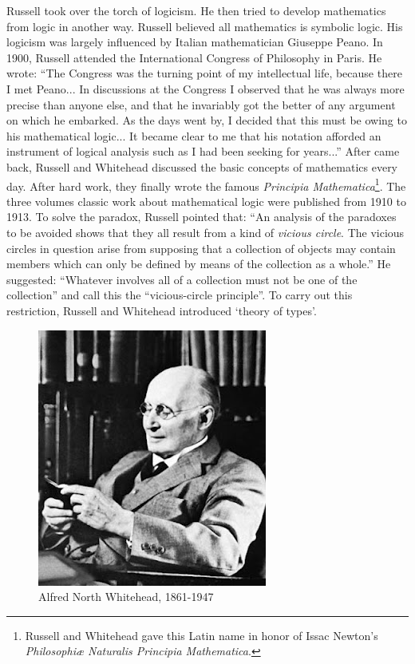 \documentclass{article}
\begin{document}
Russell took over the torch of logicism. He then tried to develop mathematics from logic in another way. Russell believed all mathematics is symbolic logic. His logicism was largely influenced by Italian mathematician Giuseppe Peano. In 1900, Russell attended the International Congress of Philosophy in Paris. He wrote: ``The Congress was the turning point of my intellectual life, because there I met Peano... In discussions at the Congress I observed that he was always more precise than anyone else, and that he invariably got the better of any argument on which he embarked. As the days went by, I decided that this must be owing to his mathematical logic... It became clear to me that his notation afforded an instrument of logical analysis such as I had been seeking for years...'' After came back, Russell and Whitehead discussed the basic concepts of mathematics every day. After hard work, they finally wrote the famous {\em Principia Mathematica}\footnote{Russell and Whitehead gave this Latin name in honor of Issac Newton's {\em Philosophiæ Naturalis Principia Mathematica}.}. The three volumes classic work about mathematical logic were published from 1910 to 1913. To solve the paradox, Russell pointed that: ``An analysis of the paradoxes to be avoided shows that they all result from a kind of {\em vicious circle}. The vicious circles in question arise from supposing that a collection of objects may contain members which can only be defined by means of the collection as a whole.'' He suggested: ``Whatever involves all of a collection must not be one of the collection'' and call this the ``vicious-circle principle''. To carry out this restriction, Russell and Whitehead introduced `theory of types'.

\begin{figure}
 \centering
 \includegraphics[scale=0.4]{img/Whitehead.jpg}
 \captionsetup{labelformat=empty}
 \caption{Alfred North Whitehead, 1861-1947}
 \label{fig:Whitehead}
\end{figure}
\end{document}
